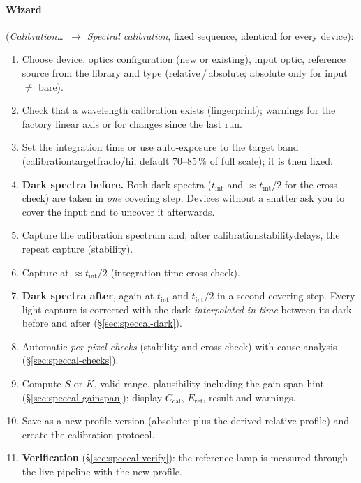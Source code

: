 \documentclass[12pt,a4paper]{article}
\DeclareRobustCommand{\key}[1]{{\ttfamily\small\color{acc2}\def\_{\rawus\allowbreak}#1}}
\begin{document}
\paragraph{Wizard} (\emph{Calibration\ldots\ $\to$ Spectral calibration}, fixed
sequence, identical for every device):
\begin{enumerate}
  \item Choose device, optics configuration (new or existing), input optic,
        reference source from the library and type (relative\,/\,absolute;
        absolute only for input $\neq$ bare).
  \item Check that a wavelength calibration exists (fingerprint); warnings for
        the factory linear axis or for changes since the last run.
  \item Set the integration time or use auto-exposure to the target band
        (\key{calibration\_target\_frac\_lo/hi}, default 70--85\,\% of full scale);
        it is then fixed.
  \item \textbf{Dark spectra before.} Both dark spectra ($t_{\mathrm{int}}$ and
        $\approx t_{\mathrm{int}}/2$ for the cross check) are taken in
        \emph{one} covering step. Devices without a shutter ask you to cover the
        input and to uncover it afterwards.
  \item Capture the calibration spectrum and, after
        \key{calibration\_stability\_delay\_s}, the repeat capture
        (stability).
  \item Capture at $\approx t_{\mathrm{int}}/2$ (integration-time cross check).
  \item \textbf{Dark spectra after}, again at $t_{\mathrm{int}}$ and
        $t_{\mathrm{int}}/2$ in a second covering step. Every light capture is
        corrected with the dark \emph{interpolated in time} between its dark
        before and after (\S\ref{sec:speccal-dark}).
  \item Automatic \emph{per-pixel checks} (stability and cross check) with
        cause analysis (\S\ref{sec:speccal-checks}).
  \item Compute $S$ or $K$, valid range, plausibility including the gain-span
        hint (\S\ref{sec:speccal-gainspan}); display $C_{\mathrm{cal}}$,
        $E_{\mathrm{ref}}$, result and warnings.
  \item Save as a new profile version (absolute: plus the derived relative
        profile) and create the calibration protocol.
  \item \textbf{Verification} (\S\ref{sec:speccal-verify}): the reference lamp is
        measured through the live pipeline with the new profile.
\end{enumerate}
\end{document}
